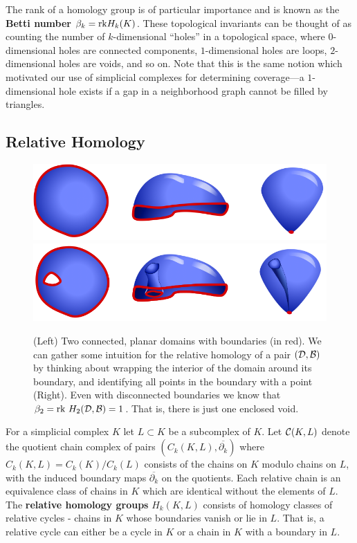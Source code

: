 The rank of a homology group is of particular importance and is known as the \textbf{Betti number} $\beta_k = \mathrm{rk} H_k(K)$.
These topological invariants can be thought of as counting the number of $k$-dimensional ``holes'' in a topological space, where $0$-dimensional holes are connected components, $1$-dimensional holes are loops, $2$-dimensional holes are voids, and so on.
Note that this is the same notion which motivated our use of simplicial complexes for determining coverage---a $1$-dimensional hole exists if a gap in a neighborhood graph cannot be filled by triangles.

\subsection{Relative Homology}

\begin{figure}[htbp]
\centering
    \includegraphics[scale=0.5]{figures/balloons1.png}\vspace{2ex}
    \includegraphics[scale=0.5]{figures/balloons3.png}
    \caption{(Left) Two connected, planar domains with boundaries (in red).
            We can gather some intuition for the relative homology of a pair $({\mathcal{D}},{\mathcal{B}})$ by thinking about wrapping the interior of the domain around its boundary, and identifying all points in the boundary with a point (Right).
            Even with disconnected boundaries we know that $\beta_2 = \mathrm{rk}~ H_2({\mathcal{D}}, {\mathcal{B}}) = 1$.  That is, there is just one enclosed void.}
    \label{fig:balloons1}
\end{figure}

For a simplicial complex $K$ let $L\subset K$ be a subcomplex of $K$.
Let $\mathcal{C}(K, L)$ denote the quotient chain complex of pairs $(C_k(K, L), \overline{\partial_k})$ where $C_k(K, L) = C_k(K)/C_k(L)$ consists of the chains on $K$ modulo chains on $L$, with the induced boundary maps $\overline{\partial_k}$ on the quotients.
Each relative chain is an equivalence class of chains in $K$ which are identical without the elements of $L$.
The \textbf{relative homology groups} $H_k(K, L)$ consists of homology classes of relative cycles - chains in $K$ whose boundaries vanish or lie in $L$.
That is, a relative cycle can either be a cycle in $K$ or a chain in $K$ with a boundary in $L$.

